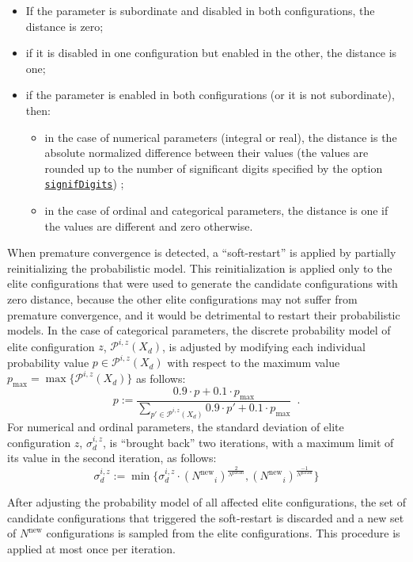 \documentclass[a4paper]{article}
\newcommand{\assign}{\ensuremath{:=}}
\newcommand{\iter}{\ensuremath{i}\xspace}
\newcommand{\Nparam}{\ensuremath{{N^\text{param}}}\xspace}
\newcommand{\Nnew}{\ensuremath{N^\text{new}}\xspace}
\newcommand{\parameter}[1]{\hyperlink{opt:#1}{\texttt{#1}}}
\begin{document}
\begin{itemize}
\item If the parameter is subordinate and disabled in both configurations, the distance is zero;
\item if it is disabled in one configuration but enabled in the other,
  the distance is one;
\item if the parameter is enabled in both configurations (or it is not subordinate), then: 

  \begin{itemize}
  \item in the case of numerical parameters (integral or real), the
  distance is the absolute normalized difference between
  their values (the values are rounded up to the number of significant digits specified by the option \parameter{signifDigits}) ;
\item in the case of ordinal and categorical parameters, the distance
  is one if the values are different and zero otherwise.
\end{itemize}
\end{itemize}

When premature convergence is detected, a ``soft-restart'' is applied
by partially reinitializing the probabilistic model. This
reinitialization is applied only to the elite configurations that were
used to generate the candidate configurations with zero distance,
because the other elite configurations may not suffer from premature
convergence, and it would be detrimental to restart their
probabilistic models. In the case of categorical parameters, the
discrete probability model of elite configuration $z$,
$\mathcal{P}^{\iter,z}(X_d)$, is adjusted by modifying each individual
probability value $p \in \mathcal{P}^{\iter,z}(X_d)$ with respect to
the maximum value $p_\text{max} = \max\{\mathcal{P}^{\iter,z}(X_d)\}$
as follows:
%
\[p \assign \frac{0.9 \cdot p + 0.1 \cdot p_\text{max}}{\sum_{p' \in \mathcal{P}^{\iter,z}(X_d)} 0.9 \cdot p' + 0.1 \cdot p_\text{max}}\enspace.\]
%
For numerical and ordinal parameters, the standard deviation of elite configuration $z$, $\sigma_d^{\iter,z}$, is ``brought back'' two iterations, with a maximum limit of its value in the second iteration, as follows:
\[
  \sigma_d^{\iter,z} \assign \min\{ \sigma_d^{\iter,z} \cdot {(\Nnew_i)}^{\frac{2}{\Nparam}},
{(\Nnew_i)}^{\frac{-1}{\Nparam}}\}
\]

After adjusting the probability model of all affected elite
configurations, the set of candidate configurations that triggered the
soft-restart is discarded and a new set of $\Nnew$ configurations is
sampled from the elite configurations. This procedure is applied at
most once per iteration.
\end{document}
